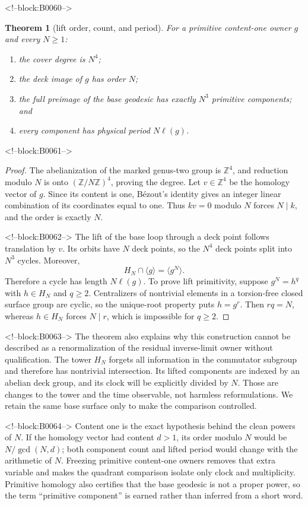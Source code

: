 \documentclass[11pt]{article}
\newtheorem{theorem}{Theorem}[section]
\theoremstyle{definition}
\theoremstyle{remark}
\newcommand{\ZZ}{\mathbb Z}
\begin{document}
<!--block:B0060-->
\begin{theorem}[lift order, count, and period]\label{thm:lifts}
For a primitive content-one owner $g$ and every $N\geq1$:
\begin{enumerate}[label=(\roman*)]
\item the cover degree is $N^4$;
\item the deck image of $g$ has order $N$;
\item the full preimage of the base geodesic has exactly $N^3$ primitive components; and
\item every component has physical period $N\ell(g)$.
\end{enumerate}
\end{theorem}

<!--block:B0061-->
\begin{proof}
The abelianization of the marked genus-two group is $\ZZ^4$, and reduction modulo $N$ is onto $(\ZZ/N\ZZ)^4$, proving the degree. Let $v\in\ZZ^4$ be the homology vector of $g$. Since its content is one, B\'ezout's identity gives an integer linear combination of its coordinates equal to one. Thus $kv=0$ modulo $N$ forces $N\mid k$, and the order is exactly $N$.

<!--block:B0062-->
The lift of the base loop through a deck point follows translation by $v$. Its orbits have $N$ deck points, so the $N^4$ deck points split into $N^3$ cycles. Moreover,
\[
H_N\cap\langle g\rangle=\langle g^N\rangle.
\]
Therefore a cycle has length $N\ell(g)$. To prove lift primitivity, suppose $g^N=h^q$ with $h\in H_N$ and $q\geq2$. Centralizers of nontrivial elements in a torsion-free closed surface group are cyclic, so the unique-root property puts $h=g^r$. Then $rq=N$, whereas $h\in H_N$ forces $N\mid r$, which is impossible for $q\geq2$.
\end{proof}

<!--block:B0063-->
The theorem also explains why this construction cannot be described as a renormalization of the residual inverse-limit owner without qualification. The tower $H_N$ forgets all information in the commutator subgroup and therefore has nontrivial intersection. Its lifted components are indexed by an abelian deck group, and its clock will be explicitly divided by $N$. Those are changes to the tower and the time observable, not harmless reformulations. We retain the same base surface only to make the comparison controlled.

<!--block:B0064-->
Content one is the exact hypothesis behind the clean powers of $N$. If the homology vector had content $d>1$, its order modulo $N$ would be $N/\gcd(N,d)$; both component count and lifted period would change with the arithmetic of $N$. Freezing primitive content-one owners removes that extra variable and makes the quadrant comparison isolate only clock and multiplicity. Primitive homology also certifies that the base geodesic is not a proper power, so the term ``primitive component'' is earned rather than inferred from a short word.
\end{document}
